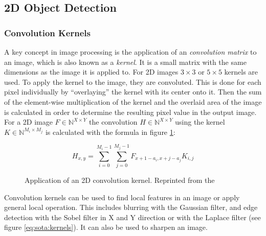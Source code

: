 \subsection{2D Object Detection}

\subsubsection{Convolution Kernels}

A key concept in image processing is the application of an \emph{convolution matrix} to an image, which is also known as a \emph{kernel}. 
It is a small matrix with the same dimensions as the image it is applied to. 
For \ac{2D} images $ 3 \times 3 $ or $5 \times 5 $ kernels are used. 
To apply the kernel to the image, they are convoluted.
This is done for each pixel individually by \enquote{overlaying} the kernel with its center onto it. 
Then the sum of the element-wise multiplication of the kernel and the overlaid area of the image is calculated in order to determine the resulting pixel value in the output image.
For a \ac{2D} image $ F \in \mathbb{N}^{X \times Y} $ the convolution $ H \in \mathbb{N}^{X \times Y} $ using the kernel $ K \in \mathbb{N}^{M_i \times M_j} $ is calculated with the formula in figure \ref{eq:sota:convolution}:

\begin{figure}[h!]
\begin{equation*}
H_{x,y} = \sum_{i=0}^{M_i-1} \sum_{j=0}^{M_j-1} F_{x+1-a_i, x+j-a_j}K_{i,j}
\end{equation*}
\caption{Application of an 2D convolution kernel. Reprinted from the \textcite[][]{opencv2018kernel}}
\label{eq:sota:convolution}
\end{figure}

Convolution kernels can be used to find local features in an image or apply general local operation.
This includes blurring with the Gaussian filter, and edge detection with the Sobel filter in X and Y direction or with the Laplace filter (see figure \ref{eq:sota:kernels}).
It can also be used to sharpen an image. 

